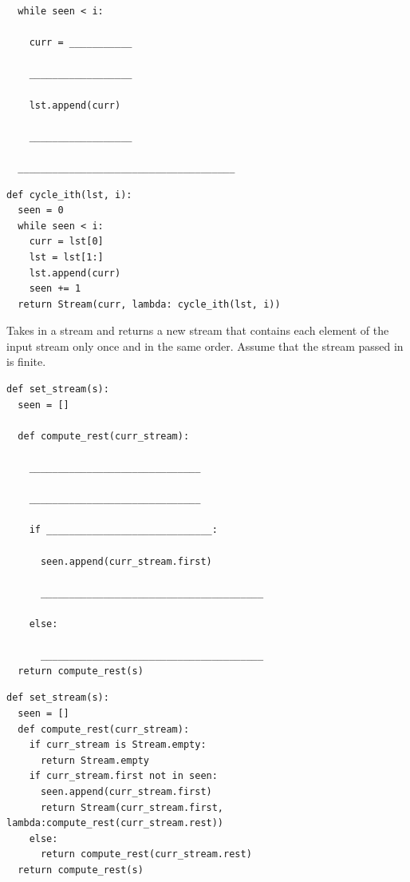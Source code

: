 \documentclass{exam}
\begin{document}
\begin{questions}
\begin{lstlisting}
  while seen < i:

    curr = ___________

    __________________

    lst.append(curr)

    __________________

  ______________________________________
\end{lstlisting}
\begin{solution}
\begin{lstlisting}
def cycle_ith(lst, i):
  seen = 0
  while seen < i:
    curr = lst[0]
    lst = lst[1:]
    lst.append(curr)
    seen += 1
  return Stream(curr, lambda: cycle_ith(lst, i))
\end{lstlisting}
\end{solution}

\item Takes in a stream and returns a new stream that contains each element of the input stream only once and in the same order. Assume that the stream passed in is finite.
\newline
\begin{lstlisting}
def set_stream(s):
  seen = []

  def compute_rest(curr_stream):

    ______________________________

    ______________________________

    if _____________________________:

      seen.append(curr_stream.first)

      _______________________________________

    else:

      _______________________________________
  return compute_rest(s)
\end{lstlisting}
\begin{solution}
\begin{lstlisting}
def set_stream(s):
  seen = []
  def compute_rest(curr_stream):
    if curr_stream is Stream.empty:
      return Stream.empty
    if curr_stream.first not in seen:
      seen.append(curr_stream.first)
      return Stream(curr_stream.first, lambda:compute_rest(curr_stream.rest))
    else:
      return compute_rest(curr_stream.rest)
  return compute_rest(s)
\end{lstlisting}
\end{solution}
\end{questions}

\end{document}

